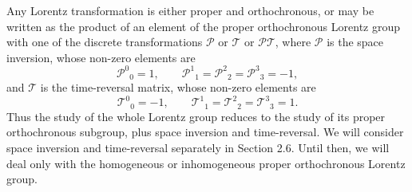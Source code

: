 Any Lorentz transformation is either proper and orthochronous, or may be
written as the product of an element of the proper orthochronous Lorentz
group with one of the discrete transformations $\mathcal{P}$ or
$\mathcal{T}$ or $\mathcal{P}\mathcal{T}$, where $\mathcal{P}$ is the space
inversion, whose non-zero elements are
\begin{equation}
  \mathcal{P}^0{}_{0}=1,
  \qquad
  \mathcal{P}^1{}_{1}=\mathcal{P}^2{}_{2}=\mathcal{P}^3{}_{3}=-1,
  \tag{2.3.15}\label{eq:2.3.15}
\end{equation}
and $\mathcal{T}$ is the time-reversal matrix, whose non-zero elements are
\begin{equation}
  \mathcal{T}^0{}_{0}=-1,
  \qquad
  \mathcal{T}^1{}_{1}=\mathcal{T}^2{}_{2}=\mathcal{T}^3{}_{3}=1.
  \tag{2.3.16}\label{eq:2.3.16}
\end{equation}
Thus the study of the whole Lorentz group reduces to the study of its
proper orthochronous subgroup, plus space inversion and time-reversal. We
will consider space inversion and time-reversal separately in Section 2.6.
Until then, we will deal only with the homogeneous or inhomogeneous proper
orthochronous Lorentz group.
